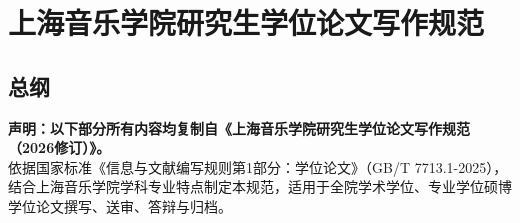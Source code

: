 
\part{上海音乐学院研究生学位论文写作规范}
\chapter{总纲}

\textbf{声明：以下部分所有内容均复制自《上海音乐学院研究生学位论文写作规范（2026修订）》。}\\

依据国家标准《信息与文献编写规则第1部分：学位论文》（GB/T 7713.1-2025），结合上海音乐学院学科专业特点制定本规范，适用于全院学术学位、专业学位硕博学位论文撰写、送审、答辩与归档。
